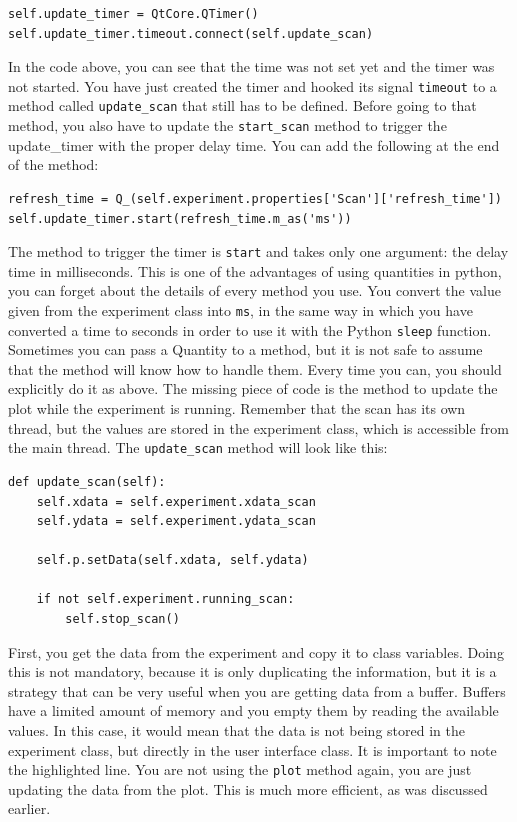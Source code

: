 \begin{verbatim}
self.update_timer = QtCore.QTimer()
self.update_timer.timeout.connect(self.update_scan)
\end{verbatim}

In the code above, you can see that the time was not set yet and the timer was not started. You have just created the timer and hooked its
signal \texttt{timeout} to a method called \texttt{update_scan} that
still has to be defined. Before going to that method, you also have to
update the \texttt{start_scan} method to trigger the update\_timer with
the proper delay time. You can add the following at the end of
the method:

\begin{verbatim}
refresh_time = Q_(self.experiment.properties['Scan']['refresh_time'])
self.update_timer.start(refresh_time.m_as('ms'))
\end{verbatim}

The method to trigger the timer is \texttt{start} and takes only one
argument: the delay time in milliseconds. This is one of the advantages
of using quantities in python, you can forget about the details of every
method you use. You convert the value given from the experiment class
into \texttt{ms}, in the same way in which you have converted a time to
seconds in order to use it with the Python \texttt{sleep} function.
Sometimes you can pass a Quantity to a method, but it is not safe to
assume that the method will know how to handle them. Every time you can,
you should explicitly do it as above. The missing piece of code is the
method to update the plot while the experiment is running. Remember that
the scan has its own thread, but the values are stored in the
experiment class, which is accessible from the main thread. The
\texttt{update_scan} method will look like this:

\begin{verbatim}
def update_scan(self):
    self.xdata = self.experiment.xdata_scan
    self.ydata = self.experiment.ydata_scan

    self.p.setData(self.xdata, self.ydata)

    if not self.experiment.running_scan:
        self.stop_scan()
\end{verbatim}

First, you get the data from the experiment and copy it to class
variables. Doing this is not mandatory, because it is only duplicating
the information, but it is a strategy that can be very useful when you
are getting data from a buffer. Buffers have a limited amount of memory
and you empty them by reading the available values. In this case, it
would mean that the data is not being stored in the experiment class,
but directly in the user interface class. It is important to note the
highlighted line. You are not using the \texttt{plot} method again, you
are just updating the data from the plot. This is much more efficient,
as was discussed earlier.

